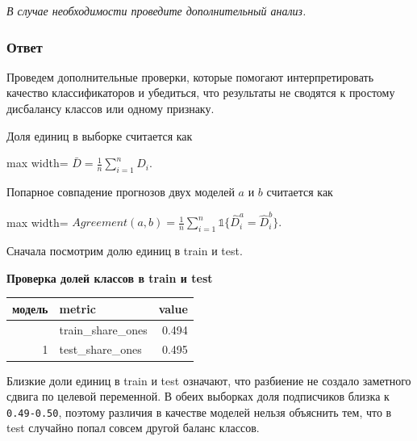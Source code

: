 \documentclass[11pt]{article}
\newcounter{none}
\newenvironment{tasktext}
      {\begin{tcolorbox}[breakable, colback=black!3, colframe=black!28,
        boxrule=0.4pt, arc=1.5mm, left=7pt, right=7pt, top=5pt, bottom=5pt,
        before skip=0.35em, after skip=0.75em]\itshape}
      {\end{tcolorbox}}
\begin{document}
\begin{tasktext}
В случае необходимости проведите дополнительный анализ.
\end{tasktext}

\subsubsection{Ответ}

Проведем дополнительные проверки, которые помогают интерпретировать
качество классификаторов и убедиться, что результаты не сводятся к
простому дисбалансу классов или одному признаку.

Доля единиц в выборке считается как

\begin{center}
\begin{adjustbox}{max width=\linewidth}
\(\displaystyle \bar D = \frac{1}{n}\sum_{i=1}^{n} D_i.\)
\end{adjustbox}
\end{center}

Попарное совпадение прогнозов двух моделей \(a\) и \(b\) считается как

\begin{center}
\begin{adjustbox}{max width=\linewidth}
\(\displaystyle Agreement(a,b) = \frac{1}{n}\sum_{i=1}^{n}\mathbb{1}\{\hat D_i^{a} = \hat D_i^{b}\}.\)
\end{adjustbox}
\end{center}

    Сначала посмотрим долю единиц в train и test.

    \textbf{Проверка долей классов в train и test}

{\def\LTcaptype{none} %
\begin{longtable}[]{@{}rlr@{}}
\toprule\noalign{}
модель & metric & value \\
\midrule\noalign{}
\endhead
\bottomrule\noalign{}
\endlastfoot
0 & train\_share\_ones & 0.494 \\
1 & test\_share\_ones & 0.495 \\
\end{longtable}
}

    Близкие доли единиц в train и test означают, что разбиение не создало
заметного сдвига по целевой переменной. В обеих выборках доля
подписчиков близка к \texttt{0.49-0.50}, поэтому различия в качестве
моделей нельзя объяснить тем, что в test случайно попал совсем другой
баланс классов.
\end{document}
